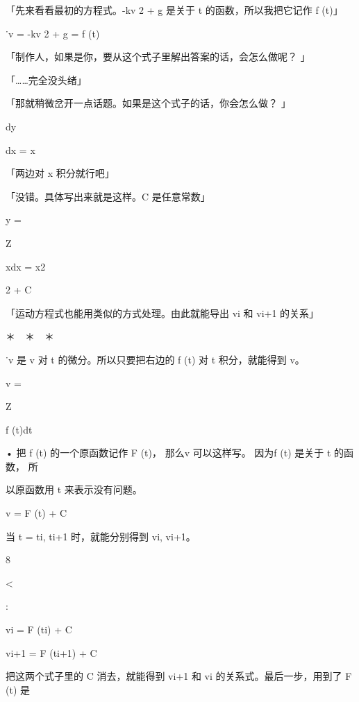 「先来看看最初的方程式。-kv 2 + g 是关于 t 的函数，所以我把它记作 f (t)」\par
˙v = -kv 2 + g = f (t)\par
「制作人，如果是你，要从这个式子里解出答案的话，会怎么做呢？ 」\par
「……完全没头绪」\par
「那就稍微岔开一点话题。如果是这个式子的话，你会怎么做？ 」\par
dy\par
dx = x\par
「两边对 x 积分就行吧」\par
「没错。具体写出来就是这样。C 是任意常数」\par
y =\par
Z\par
xdx = x2\par
2 + C\par
「运动方程式也能用类似的方式处理。由此就能导出 vi 和 vi+1 的关系」\par
＊　＊　＊\par
˙v 是 v 对 t 的微分。所以只要把右边的 f (t) 对 t 积分，就能得到 v。\par
v =\par
Z\par
f (t)dt\par
• 把 f (t) 的一个原函数记作 F (t)， 那么v 可以这样写。 因为f (t) 是关于 t 的函数， 所\par
以原函数用 t 来表示没有问题。\par
v = F (t) + C\par
当 t = ti, ti+1 时，就能分别得到 vi, vi+1。\par
8\par
<\par
:\par
vi = F (ti) + C\par
vi+1 = F (ti+1) + C\par
把这两个式子里的 C 消去，就能得到 vi+1 和 vi 的关系式。最后一步，用到了 F (t) 是\par

